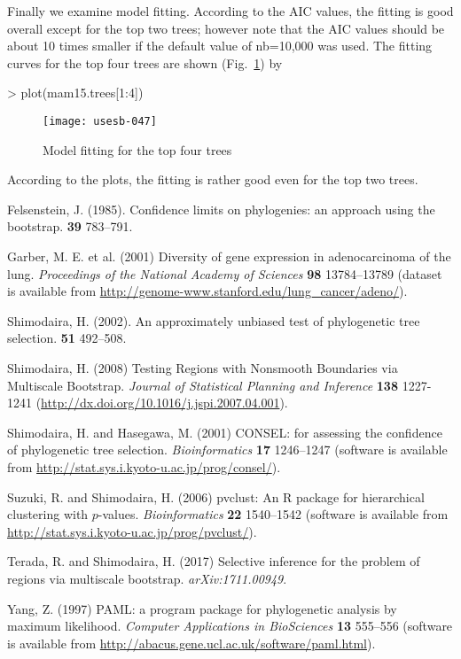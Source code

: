 \documentclass[a4paper]{amsart}
\begin{document}
Finally we examine model fitting.  According to the AIC values, the
fitting is good overall except for the top two trees; however note
that the AIC values should be about 10 times smaller if the default
value of nb=10,000 was used.  The fitting curves for the top four
trees are shown (Fig.~\ref{fig:mamplots}) by
\begin{Schunk}
\begin{Sinput}
> plot(mam15.trees[1:4])
\end{Sinput}
\end{Schunk}
\begin{figure}
\begin{center}
\texttt{[image: usesb-047]}
\caption{Model fitting for the top four trees}\label{fig:mamplots}
\end{center}
\end{figure}
According to the plots, the fitting is rather good even for the top two
trees. 

\begin{thebibliography}{9}

Felsenstein, J.
(1985).
\newblock Confidence limits on phylogenies: an approach using the bootstrap.
 {\bf 39} 783--791.

  Garber, M. E. et al. (2001)
\newblock Diversity of gene expression in adenocarcinoma of the lung.
\newblock \emph{Proceedings of the National Academy of Sciences}
  {\bf 98} 13784--13789 (dataset is available from
  \url{http://genome-www.stanford.edu/lung_cancer/adeno/}).

Shimodaira, H.
(2002).
\newblock An approximately unbiased test of phylogenetic tree selection.
 {\bf 51} 492--508.

Shimodaira, H. (2008)
\newblock Testing Regions with Nonsmooth Boundaries via Multiscale Bootstrap.
\newblock \emph{Journal of Statistical Planning and Inference}
{\bf 138} 1227-1241
(\url{http://dx.doi.org/10.1016/j.jspi.2007.04.001}).

Shimodaira, H. and Hasegawa, M. (2001)
\newblock CONSEL: for assessing the
  confidence of phylogenetic tree selection.
\newblock \emph{Bioinformatics} {\bf 17} 1246--1247 (software is available from
  \url{http://stat.sys.i.kyoto-u.ac.jp/prog/consel/}).

Suzuki, R. and Shimodaira, H. (2006)
\newblock pvclust: An R package for hierarchical clustering with $p$-values.
\newblock \emph{Bioinformatics} {\bf 22} 1540--1542 (software is available from
\url{http://stat.sys.i.kyoto-u.ac.jp/prog/pvclust/}).

Terada, R. and Shimodaira, H. (2017)
\newblock Selective inference for the problem of regions via multiscale bootstrap.
\newblock \emph{arXiv:1711.00949}.

Yang, Z. (1997)
\newblock  PAML: a program package for phylogenetic analysis by
  maximum likelihood.
\newblock \emph{Computer Applications in BioSciences}
{\bf 13} 555--556 (software is available from
  \url{http://abacus.gene.ucl.ac.uk/software/paml.html}).


\end{thebibliography}
\end{document}
